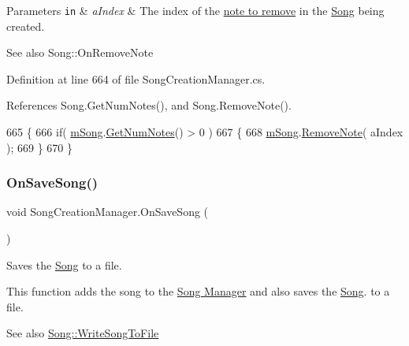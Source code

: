 \begin{DoxyParams}[1]{Parameters}
\mbox{\tt in}  & {\em a\+Index} & The index of the \hyperlink{group___music_structs_struct_music_1_1_combined_note}{note to remove} in the \hyperlink{class_song}{Song} being created.\\
\hline
\end{DoxyParams}
\begin{DoxySeeAlso}{See also}
Song\+::\+On\+Remove\+Note 
\end{DoxySeeAlso}


Definition at line 664 of file Song\+Creation\+Manager.\+cs.



References Song.\+Get\+Num\+Notes(), and Song.\+Remove\+Note().


\begin{DoxyCode}
665     \{
666         \textcolor{keywordflow}{if}( \hyperlink{group___s_c_m_priv_var_gabd8329149faef65a689650d951a9abc9}{mSong}.\hyperlink{group___song_pub_func_gad124d0af146885327f8ac455bc013b63}{GetNumNotes}() > 0 )
667         \{
668             \hyperlink{group___s_c_m_priv_var_gabd8329149faef65a689650d951a9abc9}{mSong}.\hyperlink{group___song_pub_func_ga856634e047b8c35160958c3aa53d6b28}{RemoveNote}( aIndex );
669         \}
670     \}
\end{DoxyCode}
\mbox{\label{group___s_c_m_handlers_gafd5e9f72e7a15cb77994c59fbbf8b769}} 
\subsubsection{\texorpdfstring{On\+Save\+Song()}{OnSaveSong()}}
{\footnotesize\ttfamily void Song\+Creation\+Manager.\+On\+Save\+Song (\begin{DoxyParamCaption}{ }\end{DoxyParamCaption})}



Saves the \hyperlink{class_song}{Song} to a file. 

This function adds the song to the \hyperlink{group___v_i_m_pub_ga33dae94932c10c66db76a0eebec76b01}{Song Manager} and also saves the \hyperlink{class_song}{Song}. to a file.

\begin{DoxySeeAlso}{See also}
\hyperlink{group___song_pub_func_ga70b0f6021c3b0590c561a88e3d1e5c2f}{Song\+::\+Write\+Song\+To\+File} 
\end{DoxySeeAlso}


